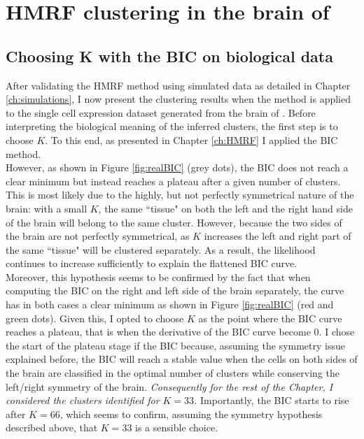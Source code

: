 \chapter{HMRF clustering in the brain of \platyfull{}}\label{ch:biology} 


	\section{Choosing K with the BIC on biological data}
	After validating the HMRF method using simulated data as detailed in Chapter \ref{ch:simulations}, I now present the clustering results when the method is applied to the single cell expression dataset generated from the brain of \platy{}. Before interpreting the biological meaning of the inferred clusters, the first step is to choose $K$. To this end, as presented in Chapter \ref{ch:HMRF} I applied the BIC method.\\
	
	However, as shown in Figure \ref{fig:realBIC} (grey dots), the BIC does not reach a clear minimum but instead reaches a plateau after a given number of clusters. This is most likely due to the highly, but not perfectly symmetrical nature of the brain: with a small $K$, the same ``tissue" on both the left and the right hand side of the brain will belong to the same cluster. However, because the two sides of the brain are not perfectly symmetrical, as $K$ increases the left and right part of the same ``tissue" will be clustered separately. As a result, the likelihood continues to increase sufficiently to explain the flattened BIC curve.\\
	
	 Moreover, this hypothesis seems to be confirmed by the fact that when computing the BIC on the right and left side of the brain separately, the curve has in both cases a clear minimum as shown in Figure \ref{fig:realBIC} (red and green dots). Given this, I opted to choose $K$ as the point where the BIC curve reaches a plateau, that is when the derivative of the BIC curve become 0. I chose the start of the plateau stage if the BIC because, assuming the symmetry issue explained before, the BIC will reach a stable value when the cells on both sides of the brain are classified in the optimal number of clusters while conserving the left/right symmetry of the brain. \emph{Consequently for the rest of the Chapter, I considered the clusters identified for $K = 33$.} Importantly, the BIC starts to rise after $K=66$, which seems to confirm, assuming the symmetry hypothesis described above, that $K=33$ is a sensible choice. \\
	 
